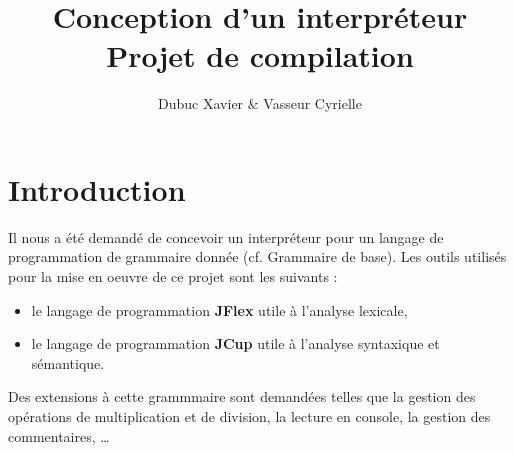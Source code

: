 \documentclass{article}
\title{Conception d'un interpréteur\\Projet de compilation}
\author{Dubuc Xavier \& Vasseur Cyrielle}
\begin{document}
\maketitle
\newpage
\tableofcontents
\newpage
\section{Introduction}
Il nous a été demandé de concevoir un interpréteur pour un langage de programmation de grammaire donnée (cf. Grammaire de base). Les outils utilisés pour la mise en oeuvre de ce projet sont les suivants :\\
\begin{itemize}
\item le langage de programmation \textbf{JFlex} utile à l'analyse lexicale,
\item le langage de programmation \textbf{JCup} utile à l'analyse syntaxique et sémantique.\\
\end{itemize}

Des extensions à cette grammmaire sont demandées telles que la gestion des opérations de multiplication et de division, la lecture en console, la gestion des commentaires, \dots
\end{document}
